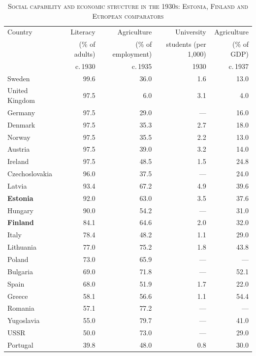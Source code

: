 \begin{table}[htbp]
\centering\footnotesize\setlength{\tabcolsep}{4pt}
\caption[Social capability and economic structure in the 1930s: Estonia, Finland and European comparators]{\textsc{Social capability and economic structure in the 1930s: Estonia, Finland and European comparators}}
\label{tab:structure}
\begin{threeparttable}
\begin{tabular}{lrrrr}
\toprule
Country & Literacy & Agriculture & University & Agriculture \\
& (\% of adults) & (\% of employment) & students (per 1,000) & (\% of GDP) \\
& c.\,1930 & c.\,1935 & 1930 & c.\,1937 \\
\midrule
Sweden & 99.6 & 36.0 & 1.6 & 13.0 \\
United Kingdom & 97.5 & 6.0 & 3.1 & 4.0 \\
Germany & 97.5 & 29.0 & --- & 16.0 \\
Denmark & 97.5 & 35.3 & 2.7 & 18.0 \\
Norway & 97.5 & 35.5 & 2.2 & 13.0 \\
Austria & 97.5 & 39.0 & 3.2 & 14.0 \\
Ireland & 97.5 & 48.5 & 1.5 & 24.8 \\
Czechoslovakia & 96.0 & 37.5 & --- & 24.0 \\
Latvia & 93.4 & 67.2 & 4.9 & 39.6 \\
\textbf{Estonia} & 92.0 & 63.0 & 3.5 & 37.6 \\
Hungary & 90.0 & 54.2 & --- & 31.0 \\
\textbf{Finland} & 84.1 & 64.6 & 2.0 & 32.0 \\
Italy & 78.4 & 48.2 & 1.1 & 29.0 \\
Lithuania & 77.0 & 75.2 & 1.8 & 43.8 \\
Poland & 73.0 & 65.9 & --- & --- \\
Bulgaria & 69.0 & 71.8 & --- & 52.1 \\
Spain & 68.0 & 51.9 & 1.7 & 22.0 \\
Greece & 58.1 & 56.6 & 1.1 & 54.4 \\
Romania & 57.1 & 77.2 & --- & --- \\
Yugoslavia & 55.0 & 79.7 & --- & 41.0 \\
USSR & 50.0 & 73.0 & --- & 29.0 \\
Portugal & 39.8 & 48.0 & 0.8 & 30.0 \\
\bottomrule
\end{tabular}

\end{threeparttable}
\end{table}
